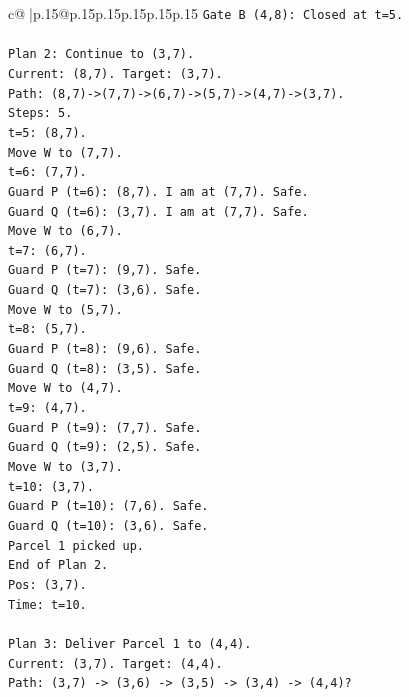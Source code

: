 \documentclass{article}
\begin{document}
{\begin{supertabular}{c@{$\;$}|p{.15\linewidth}@{}p{.15\linewidth}p{.15\linewidth}p{.15\linewidth}p{.15\linewidth}p{.15\linewidth}}
{{{\texttt{Gate B (4,8): Closed at t=5.} \\
\\ 
\texttt{Plan 2: Continue to (3,7).} \\
\texttt{Current: (8,7). Target: (3,7).} \\
\texttt{Path: (8,7){-}>(7,7){-}>(6,7){-}>(5,7){-}>(4,7){-}>(3,7).} \\
\texttt{Steps: 5.} \\
\texttt{t=5: (8,7).} \\
\texttt{Move W to (7,7).} \\
\texttt{t=6: (7,7).} \\
\texttt{Guard P (t=6): (8,7). I am at (7,7). Safe.} \\
\texttt{Guard Q (t=6): (3,7). I am at (7,7). Safe.} \\
\texttt{Move W to (6,7).} \\
\texttt{t=7: (6,7).} \\
\texttt{Guard P (t=7): (9,7). Safe.} \\
\texttt{Guard Q (t=7): (3,6). Safe.} \\
\texttt{Move W to (5,7).} \\
\texttt{t=8: (5,7).} \\
\texttt{Guard P (t=8): (9,6). Safe.} \\
\texttt{Guard Q (t=8): (3,5). Safe.} \\
\texttt{Move W to (4,7).} \\
\texttt{t=9: (4,7).} \\
\texttt{Guard P (t=9): (7,7). Safe.} \\
\texttt{Guard Q (t=9): (2,5). Safe.} \\
\texttt{Move W to (3,7).} \\
\texttt{t=10: (3,7).} \\
\texttt{Guard P (t=10): (7,6). Safe.} \\
\texttt{Guard Q (t=10): (3,6). Safe.} \\
\texttt{Parcel 1 picked up.} \\
\texttt{End of Plan 2.} \\
\texttt{Pos: (3,7).} \\
\texttt{Time: t=10.} \\
\\ 
\texttt{Plan 3: Deliver Parcel 1 to (4,4).} \\
\texttt{Current: (3,7). Target: (4,4).} \\
\texttt{Path: (3,7) {-}> (3,6) {-}> (3,5) {-}> (3,4) {-}> (4,4)?} \\
}}}
\end{supertabular}}
\end{document}
